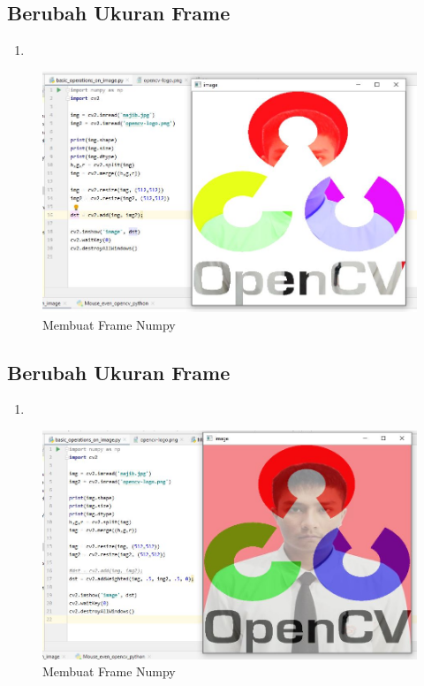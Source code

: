 \newpage
\subsection{Berubah Ukuran Frame}

\begin{enumerate}
	\item
\end{enumerate}

\begin{figure}[ht]
\centering
\includegraphics[scale=0.5]{figures/2,28.jpg}
\caption{Membuat Frame Numpy}
\label{contoh}
\end{figure}



\newpage
\subsection{Berubah Ukuran Frame}

\begin{enumerate}
	\item
\end{enumerate}

\begin{figure}[ht]
\centering
\includegraphics[scale=0.5]{figures/2,29.jpg}
\caption{Membuat Frame Numpy}
\label{contoh}
\end{figure}




